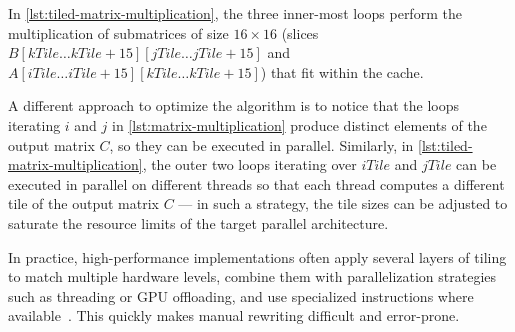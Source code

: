 In \cref{lst:tiled-matrix-multiplication}, the three inner-most loops perform the multiplication of submatrices of size $16 \times 16$ (slices $B[kTile \dots kTile + 15][jTile \dots jTile + 15]$ and $A[iTile \dots iTile + 15][kTile \dots kTile + 15]$) that fit within the cache.

A different approach to optimize the algorithm is to notice that the loops iterating $i$ and $j$ in \cref{lst:matrix-multiplication} produce distinct elements of the output matrix $C$, so they can be executed in parallel. Similarly, in \cref{lst:tiled-matrix-multiplication}, the outer two loops iterating over $iTile$ and $jTile$ can be executed in parallel on different threads so that each thread computes a different tile of the output matrix $C$ --- in such a strategy, the tile sizes can be adjusted to saturate the resource limits of the target parallel architecture.

In practice, high-performance implementations often apply several layers of tiling to match multiple hardware levels, combine them with parallelization strategies such as threading or GPU offloading, and use specialized instructions where available~\cite{allen2001optimizing,cuda_programming_guide}. This quickly makes manual rewriting difficult and error-prone.






